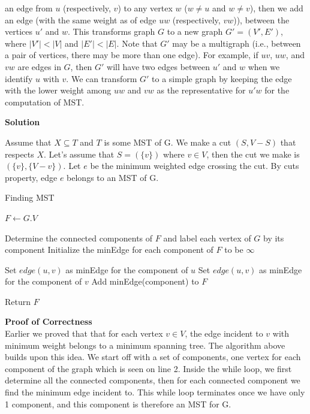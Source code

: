 \documentclass[12pt]{article}
\begin{document}
\begin{enumerate}
an edge from $u$ (respectively, $v$) to any vertex $w$ ($w\not=u$ and $w\not=v$), then we add an edge (with the same weight as of edge  $uw$ (respectively,  $vw$)), between the vertices $u'$ and $w$. This transforms graph $G$ to a new graph $G'=(V',E')$, where $|V'|<|V|$ and $|E'| < |E|$. Note that $G'$ may be a multigraph (i.e., between a pair of vertices, there may be more than one edge). For example, if $uv$,  $uw$,  and  $vw$ are edges in $G$, then $G'$ will have two edges between $u'$ and $w$ when we identify $u$ with $v$. We can transform $G'$ to a simple graph by  keeping  the edge with the lower weight among $uw$ and $vw$ as the representative for $u'w$ for the computation of MST.

\color{black}
\textbf{Solution} 

Assume that {$X \subseteq T$} and $T$ is some MST of  G. We make a cut $(S, V-S)$ that respects $X$. Let's assume that $S = (\{v\})$ where {$v \in V$}, then the cut we make is  $(\{v\}, \{V-v\})$. Let $e$ be the minimum weighted edge crossing the cut. By cuts property, edge $e$ belongs to an MST of G.

\begin{algorithm}
\caption{Finding MST}
\begin{algorithmic}[1]
	\State $F \gets G.V$ 

		\State Determine the connected components of $F$ and label each vertex of $G$ by its component
		\State Initialize the minEdge for each component of $F$ to be $\infty$
				
					\State Set $edge(u,v)$ as minEdge for the component of $u$
				\EndIf
					\State Set $edge(u,v)$ as minEdge for the component of $v$
				\EndIf
			\EndIf
		\EndFor
				\State Add minEdge(component) to $F$
		\EndFor			
	\EndWhile

	\State Return $F$
\EndProcedure
\end{algorithmic}
\end{algorithm}

\textbf{Proof of Correctness}\\
Earlier we proved that that for each vertex $v \in V$, the edge incident to $v$ with minimum weight belongs to a minimum spanning tree. The algorithm above builds upon this idea. We start off with a set of components, one vertex for each component of the graph which is seen on line 2. Inside the while loop, we first determine all the connected components, then for each connected component we find the minimum edge incident to. This while loop terminates once we have only 1 component, and this component is therefore an MST for G. 


\end{enumerate}
\end{document}
